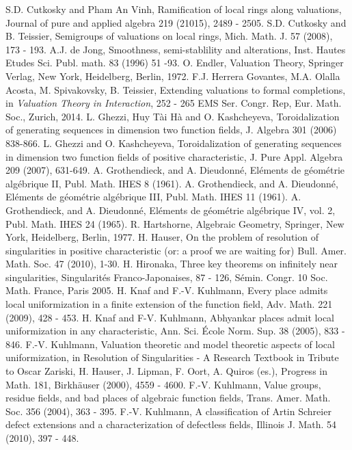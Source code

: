 \documentclass[11pt]{amsart}
\begin{document}
\begin{thebibliography}{1000000000}
 S.D. Cutkosky and Pham An Vinh, Ramification of local rings along valuations,  Journal of pure and applied algebra 219 (21015), 2489 - 2505.
 S.D. Cutkosky and B. Teissier, Semigroups of valuations on local rings,
Mich. Math. J. 57 (2008), 173 - 193.
 A.J. de Jong, Smoothness, semi-stablility and alterations, Inst. Hautes Etudes Sci. Publ. math. 83 (1996) 51 -93.
 O. Endler, Valuation Theory, Springer Verlag, New York, Heidelberg, Berlin, 1972.
 F.J. Herrera Govantes, M.A. Olalla Acosta, M. Spivakovsky, B. Teissier, Extending valuations to formal completions, in {\it Valuation Theory in Interaction}, 
252 - 265 EMS Ser. Congr. Rep, Eur. Math. Soc., Zurich, 2014.
 L. Ghezzi, Huy T\`ai H\`a and O. Kashcheyeva, Toroidalization of generating sequences in dimension two
function fields, J. Algebra 301 (2006) 838-866.
 L. Ghezzi and O. Kashcheyeva, Toroidalization of generating sequences in dimension two
function fields of positive characteristic, J. Pure Appl. Algebra 209 (2007), 631-649.
 A. Grothendieck, and A. Dieudonn\'e, El\'ements de g\'eom\'etrie alg\'ebrique II, Publ. Math. IHES 8 (1961).
 A. Grothendieck, and A. Dieudonn\'e, El\'ements de g\'eom\'etrie alg\'ebrique III,  Publ. Math. IHES 11 (1961).
 A. Grothendieck, and A. Dieudonn\'e, El\'ements de g\'eom\'etrie alg\'ebrique IV, vol. 2, Publ. Math. IHES 24 (1965).
 R. Hartshorne, Algebraic Geometry, Springer, New York, Heidelberg, Berlin, 1977.
 H. Hauser, On the problem of resolution of singularities in positive characteristic (or: a proof we are waiting for) Bull. Amer. Math. Soc. 47 (2010), 1-30.
 H. Hironaka, Three key theorems on infinitely near singularities, Singularit\'es Franco-Japonaises, 87 - 126, S\'emin. Congr. 10 Soc. Math. France, Paris 2005.
 H. Knaf and F.-V. Kuhlmann, Every place admits local uniformization in a finite extension of the function field, Adv. Math. 221 (2009), 428 - 453.
 H. Knaf and F-V. Kuhlmann, Abhyankar places admit local uniformization in any characteristic, Ann. Sci. \'Ecole Norm. Sup. 38 (2005), 833 - 846.
 F.-V. Kuhlmann,   Valuation theoretic and model theoretic aspects of local uniformization, in Resolution of Singularities -
A Research Textbook in Tribute to Oscar Zariski, H. Hauser, J. Lipman, F. Oort, A. Quiros (es.), Progress in Math. 181, Birkh\"auser (2000), 4559 - 4600.
 F.-V. Kuhlmann, Value groups, residue fields, and bad places of algebraic function fields, Trans. Amer. Math. Soc. 356 (2004), 363 - 395.
 F.-V. Kuhlmann, A classification of Artin Schreier defect extensions and a characterization of defectless fields,
Illinois J. Math. 54 (2010), 397 - 448.


\end{thebibliography}
\end{document}
